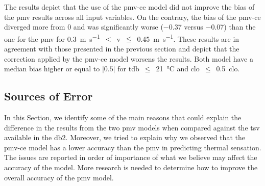 The results depict that the use of the \ac{pmv-ce} model did not improve the bias of the \ac{pmv} results across all input variables.
On the contrary, the bias of the \ac{pmv-ce} diverged more from 0 and was significantly worse (\num{-.37} versus \num{-0.07}) than the one for the \ac{pmv} for \qty{0.3}{\m\per\s}~$<$~\ac{v}~$\leq$~\qty{0.45}{\m\per\s}.
These results are in agreement with those presented in the previous section and depict that the correction applied by the \ac{pmv-ce} model worsens the results.
Both model have a median bias higher or equal to $\lvert0.5\lvert$ for \ac{tdb}~$\leq$~\qty{21}{\celsius} and \ac{clo}~$\leq$~\qty{.5}{clo}.

\subsection{Sources of Error}\label{subsec:sources-of-error}
In this Section, we identify some of the main reasons that could explain the difference in the results from the two \ac{pmv} models when compared against the \ac{tsv} available in the \ac{db2}.
Moreover, we tried to explain why we observed that the \ac{pmv-ce} model has a lower accuracy than the \ac{pmv} in predicting thermal sensation.
The issues are reported in order of importance of what we believe may affect the accuracy of the model.
More research is needed to determine how to improve the overall accuracy of the \ac{pmv} model.

